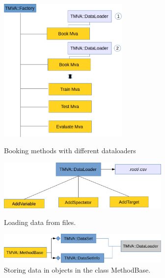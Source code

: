 \documentclass[a4paper]{jpconf}
\begin{document}
\begin{figure}[h]
\begin{minipage}{15pc}
\includegraphics[width=15pc]{img/dl1.png}
\caption{\label{dl1}Booking methods with different dataloaders}
\end{minipage}\hspace{2pc}%
\begin{minipage}{15pc}
\includegraphics[width=20pc]{img/dl2.png}
\caption{\label{dl2}Loading data from files.}
\includegraphics[width=20pc]{img/dl3.png}
\caption{\label{dl3}Storing data in objects in the class MethodBase.}
\end{minipage} 
\end{figure}
\end{document}
